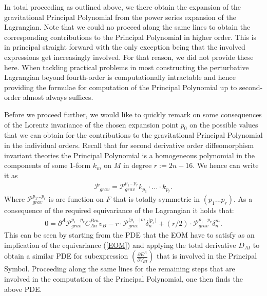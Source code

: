 \documentclass[a4paper,12pt, DIV=14, BCOR=5mm, twoside, headsepline, numbers=noenddot]{scrbook}
\begin{document}
In total proceeding as outlined above, we there obtain the expansion of the gravitational Principal Polynomial from the power series expansion of the Lagrangian.
Note that we could no proceed along the same lines to obtain the corresponding contributions to the Principal Polynomial in higher order. This is in principal straight forward with the only exception being that the involved expressions get increasingly involved. For that reason, we did not provide these here. When tackling practical problems in most constructing the perturbative Lagrangian beyond fourth-order is computationally intractable and hence providing the formulae for computation of the Principal Polynomial up to second-order almost always suffices.

Before we proceed further, we would like to quickly remark on some consequences of the Lorentz invariance of the chosen expansion point $p_0$ on the possible values that we can obtain for the contributions to the gravitational Principal Polynomial in the individual orders. Recall that for second derivative order diffeomorphism invariant theories the Principal Polynomial is a homogeneous polynomial in the components of some 1-form $k_m$ on $M$ in degree $r := 2n-16$. We hence can write it as 
\begin{align}
    \mathcal{P}_{grav} = \mathcal{P}_{grav}^{{p_1}...{p_{r}}} k_{p_1} \cdot ... \cdot k_{p_r}.
\end{align}
Where $\mathcal{P}_{grav}^{{p_1}...{p_r}}$ is are function on $F$ that is totally symmetric in $(p_1...p_r)$. As a consequence of the required equivariance of the Lagrangian it holds that:
\begin{align}\label{polyEqn}
    0 = \partial^A\mathcal{P}_{grav}^{{p_1}...{p_r}}C_{An}^{Bm}v_B - r \cdot \mathcal{P}_{grav}^{({p_1}...\vert m} \delta_{n}^{\vert p_r) }  + (r/2) \cdot \mathcal{P}_{grav}^{{p_1}...{p_r}} \delta^m_n.
\end{align}
%
%
%
This can be seen by starting from the PDE that the EOM have to satisfy as an implication of the equivariance (\ref{EOM}) and applying the total derivative $D_{AI}$ to obtain a similar PDE for subexpression $\left ( \frac{\partial E^A}{\partial V_{BI}} \right )$ that is involved in the Principal Symbol. Proceeding along the same lines for the remaining steps that are involved in the computation of the Principal Polynomial, one then finds the above PDE. 
\end{document}
